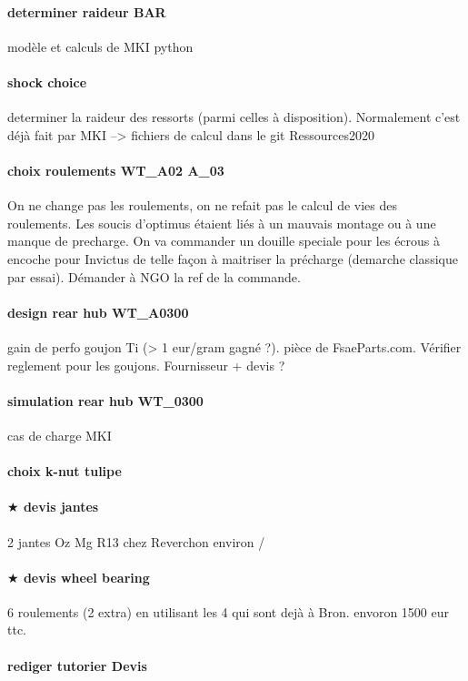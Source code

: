 \paragraph{determiner raideur BAR} modèle et calculs de MKI python
\paragraph{shock choice} determiner la raideur des ressorts (parmi celles à disposition). Normalement c'est déjà fait par MKI --> fichiers de calcul dans le git Ressources2020 
\paragraph{choix roulements WT\_A02 A\_03} On ne change pas les roulements, on ne refait pas le calcul de vies des roulements. Les soucis d'optimus étaient liés à un mauvais montage ou à une manque de precharge. On va commander un douille speciale pour les écrous à encoche pour Invictus de telle façon à maitriser la précharge (demarche classique par essai). Démander à NGO la ref de la commande.
\paragraph{design rear hub WT\_A0300} gain de perfo goujon Ti (> 1 eur/gram gagné ?). pièce de FsaeParts.com. Vérifier reglement pour les goujons. Fournisseur + devis ?
\paragraph{simulation rear hub WT\_0300} cas de charge MKI
\paragraph{choix k-nut tulipe} 
\paragraph{$\bigstar$ devis jantes} 2 jantes Oz Mg R13 chez Reverchon environ /%
\paragraph{$\bigstar$ devis wheel bearing}  6 roulements (2 extra) en utilisant les 4 qui sont dejà à Bron. envoron 1500 eur ttc. 
\paragraph{rediger tutorier Devis} 
